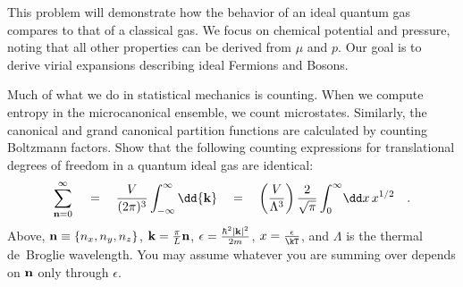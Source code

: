This problem will demonstrate how the behavior of 
an ideal quantum gas
compares to that of a classical gas.
We focus on chemical potential and pressure,
noting that all other properties can be derived from $\mu$ and $p$.
Our goal is to derive virial expansions describing
ideal Fermions and Bosons.

\smallskip \subp
Much of what we do in statistical mechanics is counting.
When we compute entropy in the microcanonical ensemble,
we count microstates.
Similarly, the canonical and grand canonical
partition functions are calculated
by counting Boltzmann factors.
Show that the following counting expressions
for translational degrees of freedom
in a quantum ideal gas are identical:
\[
\sum_{{\bf n} = 0}^\infty \, \quad = \quad 
\frac{V}{(2\pi)^3} \int_{-\infty}^{\infty}\dd{\bf k} \quad = \quad
\left(\frac{V}{\Lambda^3}\right) \frac{2}{\sqrt\pi} \int_0^\infty
  \!\dd x\, x^{1/2}
\quad .
\]
Above,
${\bf n} \equiv \{n_x,n_y,n_z\}$,
${\bf k} = \frac{\pi}{L} {\bf n}$,
$\epsilon = \frac{\hbar^2 |{\bf k}|^2}{2 m}$,
$x = \frac{\epsilon}{\kT}$,
and $\Lambda$ is the thermal de~Broglie wavelength. 
You may assume whatever you are summing over
depends on ${\bf n}$ only through $\epsilon$. 
